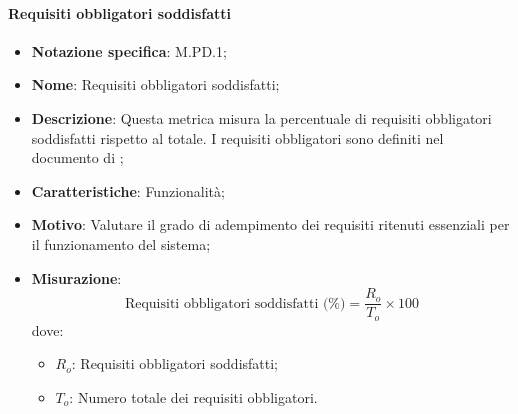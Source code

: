 \paragraph*{Requisiti obbligatori soddisfatti}
\begin{itemize}
    \item \textbf{Notazione specifica}: M.PD.1;
    \item \textbf{Nome}: Requisiti obbligatori soddisfatti;
    \item \textbf{Descrizione}: Questa metrica misura la percentuale di requisiti obbligatori soddisfatti rispetto al totale. I requisiti obbligatori sono definiti nel documento di \AnalisiDeiRequisiti;
    \item \textbf{Caratteristiche}: Funzionalità;
    \item \textbf{Motivo}: Valutare il grado di adempimento dei requisiti ritenuti essenziali per il funzionamento del sistema;
    \item \textbf{Misurazione}:
    \[
    \text{Requisiti obbligatori soddisfatti (\%)} = \frac{R_{o}}{T_{o}} \times 100
    \]
    dove:
    \begin{itemize}
        \item $R_{o}$: Requisiti obbligatori soddisfatti;
        \item $T_{o}$: Numero totale dei requisiti obbligatori.
    \end{itemize}
\end{itemize}
